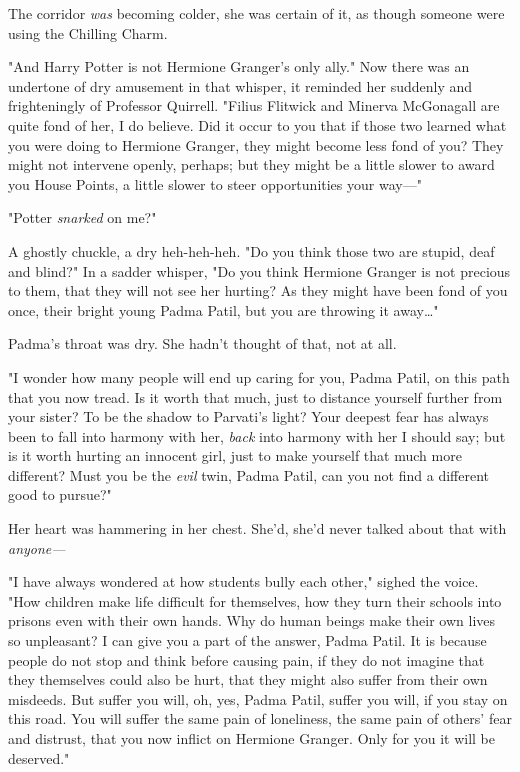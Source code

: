 The corridor \emph{was} becoming colder, she was certain of it, as though 
someone were using the Chilling Charm.

"And Harry Potter is not Hermione Granger's only ally." Now there was an 
undertone of dry amusement in that whisper, it reminded her suddenly and 
frighteningly of Professor Quirrell. "Filius Flitwick and Minerva McGonagall 
are quite fond of her, I do believe. Did it occur to you that if those two 
learned what you were doing to Hermione Granger, they might become less fond of 
you? They might not intervene openly, perhaps; but they might be a little 
slower to award you House Points, a little slower to steer opportunities your 
way---"

"Potter \emph{snarked} on me?"

A ghostly chuckle, a dry heh-heh-heh. "Do you think those two are stupid, deaf 
and blind?" In a sadder whisper, "Do you think Hermione Granger is not precious 
to them, that they will not see her hurting? As they might have been fond of 
you once, their bright young Padma Patil, but you are throwing it away{\ldots}"

Padma's throat was dry. She hadn't thought of that, not at all.

"I wonder how many people will end up caring for you, Padma Patil, on this path 
that you now tread. Is it worth that much, just to distance yourself further 
from your sister? To be the shadow to Parvati's light? Your deepest fear has 
always been to fall into harmony with her, \emph{back} into harmony with her I 
should say; but is it worth hurting an innocent girl, just to make yourself 
that much more different? Must you be the \emph{evil} twin, Padma Patil, can 
you not find a different good to pursue?"

Her heart was hammering in her chest. She'd, she'd never talked about that with 
\emph{anyone---}

"I have always wondered at how students bully each other," sighed the voice. 
"How children make life difficult for themselves, how they turn their schools 
into prisons even with their own hands. Why do human beings make their own 
lives so unpleasant? I can give you a part of the answer, Padma Patil. It is 
because people do not stop and think before causing pain, if they do not 
imagine that they themselves could also be hurt, that they might also suffer 
from their own misdeeds. But suffer you will, oh, yes, Padma Patil, suffer you 
will, if you stay on this road. You will suffer the same pain of loneliness, 
the same pain of others' fear and distrust, that you now inflict on Hermione 
Granger. Only for you it will be deserved."

